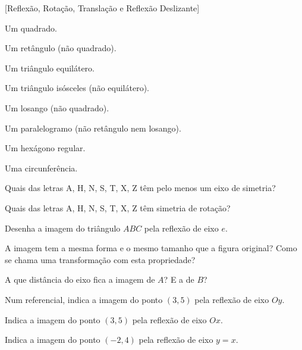 \documentclass[12pt]{article}
\begin{document}
[Reflexão, Rotação, Translação e Reflexão Deslizante]


\begin{exercicios}
  \item Um quadrado.
  \item Um retângulo (não quadrado).
  \item Um triângulo equilátero.
  \item Um triângulo isósceles (não equilátero).
  \item Um losango (não quadrado).
  \item Um paralelogramo (não retângulo nem losango).
  \item Um hexágono regular.
  \item Uma circunferência.
  \item Quais das letras A, H, N, S, T, X, Z têm pelo menos um eixo de simetria?
  \item Quais das letras A, H, N, S, T, X, Z têm simetria de rotação?
\end{exercicios}


\begin{center}
\end{center}

\begin{exercicios}
  \item Desenha a imagem do triângulo $ABC$ pela reflexão de eixo $e$.
  \item A imagem tem a mesma forma e o mesmo tamanho que a figura original? Como se chama uma transformação com esta propriedade?
  \item A que distância do eixo fica a imagem de $A$? E a de $B$?
  \item Num referencial, indica a imagem do ponto $(3, 5)$ pela reflexão de eixo $Oy$.
  \item Indica a imagem do ponto $(3, 5)$ pela reflexão de eixo $Ox$.
  \item Indica a imagem do ponto $(-2, 4)$ pela reflexão de eixo $y = x$.
\end{exercicios}
\end{document}

